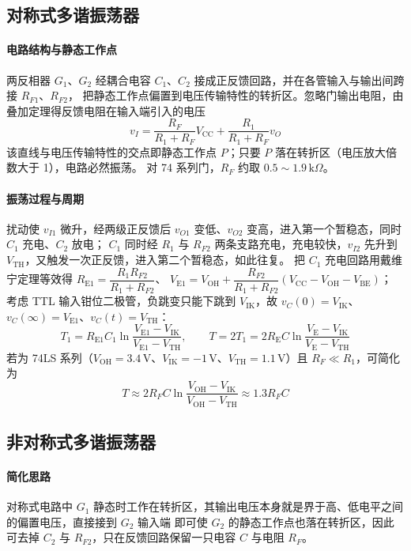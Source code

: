 \subsection{对称式多谐振荡器}
\paragraph{电路结构与静态工作点}
两反相器 $G_1$、$G_2$ 经耦合电容 $C_1$、$C_2$ 接成正反馈回路，并在各管输入与输出间跨接 $R_{F1}$、$R_{F2}$，
把静态工作点偏置到电压传输特性的转折区。忽略门输出电阻，由叠加定理得反馈电阻在输入端引入的电压
\[
v_I=\frac{R_F}{R_1+R_F}V_\text{CC}+\frac{R_1}{R_1+R_F}v_O
\]
该直线与电压传输特性的交点即静态工作点 $P$；只要 $P$ 落在转折区（电压放大倍数大于 1），电路必然振荡。
对 74 系列门，$R_F$ 约取 $0.5\sim1.9\,\mathrm{k}\Omega$。

\paragraph{振荡过程与周期}
扰动使 $v_{I1}$ 微升，经两级正反馈后 $v_{O1}$ 变低、$v_{O2}$ 变高，进入第一个暂稳态，同时 $C_1$ 充电、$C_2$ 放电；
$C_1$ 同时经 $R_1$ 与 $R_{F2}$ 两条支路充电，充电较快，$v_{I2}$ 先升到 $V_\text{TH}$，又触发一次正反馈，进入第二个暂稳态，如此往复。
把 $C_1$ 充电回路用戴维宁定理等效得 $R_{\text{E}1}=\dfrac{R_1R_{F2}}{R_1+R_{F2}}$、
$V_{\text{E}1}=V_\text{OH}+\dfrac{R_{F2}}{R_1+R_{F2}}\left(V_\text{CC}-V_\text{OH}-V_\text{BE}\right)$；
考虑 TTL 输入钳位二极管，负跳变只能下跳到 $V_\text{IK}$，故 $v_C(0)=V_\text{IK}$、$v_C(\infty)=V_{\text{E}1}$、$v_C(t)=V_\text{TH}$：
\[
T_1=R_{\text{E}1}C_1\ln\frac{V_{\text{E}1}-V_\text{IK}}{V_{\text{E}1}-V_\text{TH}},
\qquad
T=2T_1=2R_\text{E}C\ln\frac{V_\text{E}-V_\text{IK}}{V_\text{E}-V_\text{TH}}
\]
若为 74LS 系列（$V_\text{OH}=3.4\,\mathrm{V}$、$V_\text{IK}=-1\,\mathrm{V}$、$V_\text{TH}=1.1\,\mathrm{V}$）且 $R_F\ll R_1$，可简化为
\[
T\approx2R_FC\ln\frac{V_\text{OH}-V_\text{IK}}{V_\text{OH}-V_\text{TH}}\approx1.3R_FC
\]

\subsection{非对称式多谐振荡器}
\paragraph{简化思路}
对称式电路中 $G_1$ 静态时工作在转折区，其输出电压本身就是界于高、低电平之间的偏置电压，直接接到 $G_2$ 输入端
即可使 $G_2$ 的静态工作点也落在转折区，因此可去掉 $C_2$ 与 $R_{F2}$，只在反馈回路保留一只电容 $C$ 与电阻 $R_F$。

